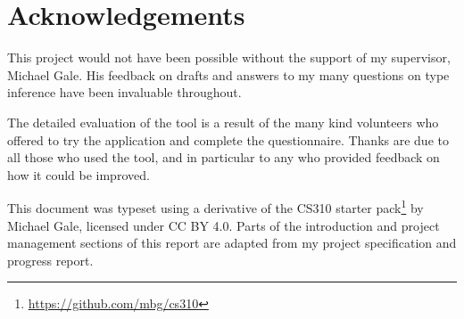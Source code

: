 \documentclass[a4paper,fleqn,oneside,12pt]{report}
\begin{document}
\chapter*{Acknowledgements}\label{id:h.xqaef57orpsv}

This project would not have been possible without the support of my supervisor, Michael Gale. His feedback on drafts and answers to my many questions on type inference have been invaluable throughout.

The detailed evaluation of the tool is a result of the many kind volunteers who offered to try the application and complete the questionnaire. Thanks are due to all those who used the tool, and in particular to any who provided feedback on how it could be improved.

This document was typeset using a derivative of the CS310 starter pack\footnote{\href{https://github.com/mbg/cs310}{https://github.com/mbg/cs310}} by Michael Gale, licensed under CC BY 4.0. Parts of the introduction and project management sections of this report are adapted from my project specification and progress report.



\end{document}
